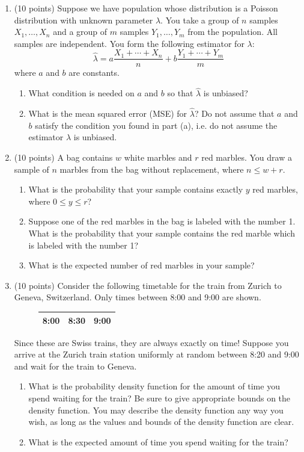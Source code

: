 \documentclass[12pt]{article}
\begin{document}
\begin{enumerate}
\pagebreak

\item (10 points) Suppose we have population whose distribution is a Poisson distribution with unknown parameter $\lambda$. You take a group of $n$ samples $X_1, \dots, X_n$ and a group of $m$ samples $Y_1, \dots, Y_m$ from the population. All samples are independent. You form the following estimator for $\lambda$:
\[
\hat{\lambda} = a \frac{X_1 + \cdots + X_n}{n} + b \frac{Y_1 + \cdots + Y_m}{m} 
\]
where $a$ and $b$ are constants.
\begin{enumerate}
\item What condition is needed on $a$ and $b$ so that $\hat{\lambda}$ is unbiased?
\item What is the mean squared error (MSE) for $\hat{\lambda}$? Do not assume that $a$ and $b$ satisfy the condition you found in part (a), i.e. do not assume the estimator $\hat{\lambda}$ is unbiased.
\end{enumerate}

\pagebreak

\item (10 points) A bag contains $w$ white marbles and $r$ red marbles. You draw a sample of $n$ marbles from the bag without replacement, where $n \leq w + r$.
\begin{enumerate}
\item What is the probability that your sample contains exactly $y$ red marbles, where $0 \leq y \leq r$?
\item Suppose one of the red marbles in the bag is labeled with the number 1. What is the probability that your sample contains the red marble which is labeled with the number 1?
\item What is the expected number of red marbles in your sample?
\end{enumerate}

\pagebreak

\item (10 points) Consider the following timetable for the train from Zurich to Geneva, Switzerland. Only times between 8:00 and 9:00 are shown.
\begin{figure}[H]
\centering
\label{my-label}
\begin{tabular}{|l|l|l|}
\hline
8:00 & 8:30 & 9:00 \\ \hline
\end{tabular}
\end{figure}
Since these are Swiss trains, they are always exactly on time! Suppose you arrive at the Zurich train station uniformly at random between 8:20 and 9:00 and wait for the train to Geneva. 
\begin{enumerate}
\item What is the probability density function for the amount of time you spend waiting for the train? Be sure to give appropriate bounds on the density function. You may describe the density function any way you wish, as long as the values and bounds of the density function are clear.
\item What is the expected amount of time you spend waiting for the train?
\end{enumerate}
\end{enumerate}
\end{document}
